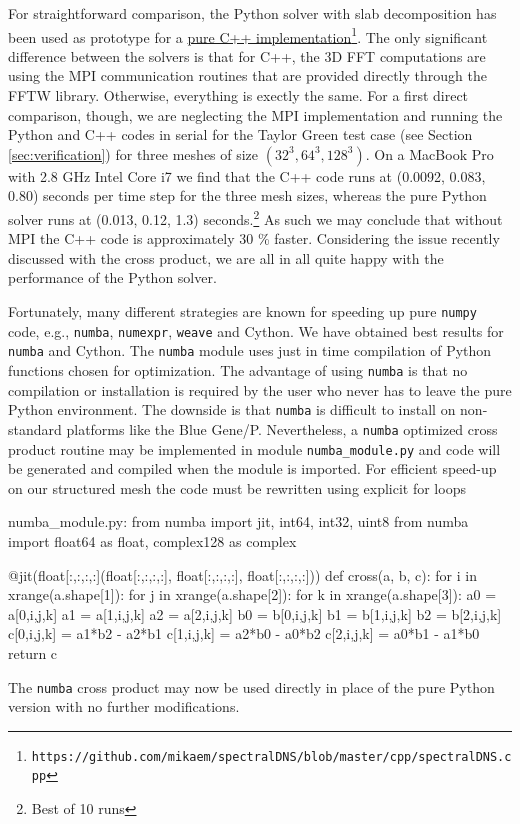 \documentclass[11pt, oneside]{article}
\newcommand{\inpyth}{\lstinline[keywordstyle={}, basicstyle=\ttfamily]} %[]%
\begin{document}
For straightforward comparison, the Python solver with slab decomposition has been used as prototype for a
\href{https://github.com/mikaem/spectralDNS/blob/master/cpp/spectralDNS.cpp}{pure C++ implementation}\footnote{\texttt{https://github.com/mikaem/spectralDNS/blob/master/cpp/spectralDNS.cpp}}. The
only significant difference between the solvers is that for C++, the 3D FFT computations are using the MPI communication routines that are provided directly through the FFTW library. Otherwise, everything is exectly the same. For a first direct comparison, though, we are neglecting the MPI implementation and running the Python and C++ codes in serial for the Taylor Green test case (see Section \ref{sec:verification}) for three meshes of size $(32^3, 64^3, 128^3)$. On a
MacBook Pro with 2.8 GHz Intel Core i7 we find that the C++ code runs at (0.0092, 0.083, 0.80) seconds per time step for the three mesh sizes, whereas the pure Python solver runs at (0.013, 0.12, 1.3) seconds.\footnote{Best of 10 runs} As such we may conclude that without MPI the C++ code is approximately 30 \% faster. Considering the issue recently discussed with the cross product, we are all in all quite happy with the performance of the Python solver.

Fortunately, many different strategies are known for speeding up pure \texttt{numpy} code, e.g.,  \inpyth{numba}, \inpyth{numexpr}, \inpyth{weave} and Cython. We have obtained best results for \inpyth{numba} and Cython. The \inpyth{numba} module uses just in time compilation of Python functions chosen for optimization. The advantage of using \texttt{numba} is that no compilation or installation is required by the user who never has to leave the pure Python environment. The downside is that \inpyth{numba} is difficult to install on non-standard platforms like the Blue Gene/P. Nevertheless, a \texttt{numba} optimized cross product routine may be implemented in module \inpyth{numba_module.py} and code will be generated and compiled when the module is imported.  For efficient speed-up on our structured mesh the code must be rewritten using explicit for loops
\begin{python}
numba_module.py:
from numba import jit, int64, int32, uint8
from numba import float64 as float, complex128 as complex

@jit(float[:,:,:,:](float[:,:,:,:], float[:,:,:,:], float[:,:,:,:]))
def cross(a, b, c):
    for i in xrange(a.shape[1]):
        for j in xrange(a.shape[2]):
            for k in xrange(a.shape[3]):
                a0 = a[0,i,j,k]
                a1 = a[1,i,j,k]
                a2 = a[2,i,j,k]
                b0 = b[0,i,j,k]
                b1 = b[1,i,j,k]
                b2 = b[2,i,j,k]
                c[0,i,j,k] = a1*b2 - a2*b1
                c[1,i,j,k] = a2*b0 - a0*b2
                c[2,i,j,k] = a0*b1 - a1*b0
    return c
\end{python}
The \texttt{numba} cross product may now be used directly in place of the pure Python version with no further modifications.
\end{document}
